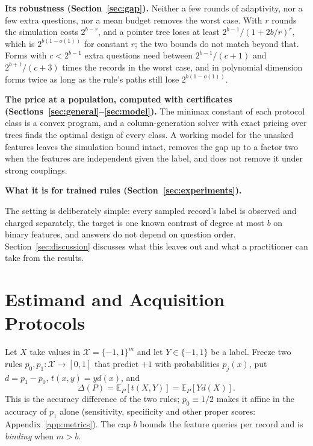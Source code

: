 \documentclass{article}
\newcommand{\E}{\mathbb{E}}
\newcommand{\X}{\mathcal X}
\begin{document}
\textbf{Its robustness (Section~\ref{sec:gap}).} Neither a few rounds of adaptivity, nor a few extra questions, nor a mean budget removes the worst case. With $r$ rounds the simulation costs $2^{b-r}$, and a pointer tree loses at least $2^{b-1}/(1+2b/r)^r$, which is $2^{b(1-o(1))}$ for constant $r$; the two bounds do not match beyond that. Forms with $c<2^{b-1}$ extra questions need between $2^{b-1}/(c+1)$ and $2^{b+1}/(c+3)$ times the records in the worst case, and in polynomial dimension forms twice as long as the rule's paths still lose $2^{b(1-o(1))}$.

\textbf{The price at a population, computed with certificates (Sections~\ref{sec:general}--\ref{sec:model}).} The minimax constant of each protocol class is a convex program, and a column-generation solver with exact pricing over trees finds the optimal design of every class. A working model for the unasked features leaves the simulation bound intact, removes the gap up to a factor two when the features are independent given the label, and does not remove it under strong couplings.

\textbf{What it is for trained rules (Section~\ref{sec:experiments}).} \nContribData

The setting is deliberately simple: every sampled record's label is observed and charged separately, the target is one known contrast of degree at most $b$ on binary features, and answers do not depend on question order. Section~\ref{sec:discussion} discusses what this leaves out and what a practitioner can take from the results.

\section{Estimand and Acquisition Protocols}\label{sec:setup}
Let $X$ take values in $\X=\{-1,1\}^m$ and let $Y\in\{-1,1\}$ be a label. Freeze two rules $p_0,p_1:\X\to[0,1]$ that predict $+1$ with probabilities $p_j(x)$, put $d=p_1-p_0$, $t(x,y)=yd(x)$, and
\begin{equation}
 \Delta(P)=\E_P[t(X,Y)]=\E_P[Yd(X)].\label{eq:gain}
\end{equation}
This is the accuracy difference of the two rules; $p_0\equiv1/2$ makes it affine in the accuracy of $p_1$ alone (sensitivity, specificity and other proper scores: Appendix~\ref{app:metrics}). The cap $b$ bounds the feature queries per record and is \emph{binding} when $m>b$.
\end{document}
